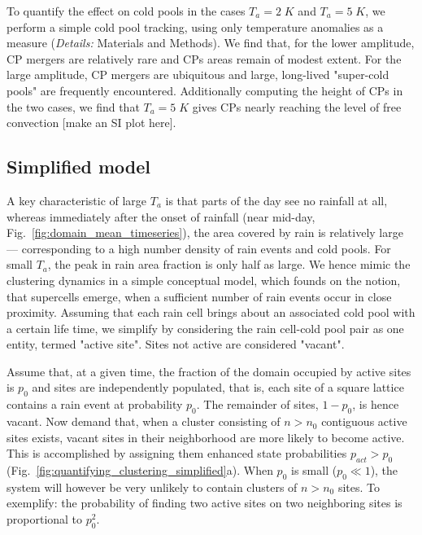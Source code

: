 \documentclass[draft,linenumbers]{agujournal2019}
\begin{document}
To quantify the effect on cold pools in the cases $T_a=2\;K$ and $T_a=5\;K$, we perform a simple cold pool tracking, using only temperature anomalies as a measure ({\it Details:} Materials and Methods).
We find that, for the lower amplitude, CP mergers are relatively rare and CPs areas remain of modest extent. 
For the large amplitude, CP mergers are ubiquitous and large, long-lived "super-cold pools" are frequently encountered. 
Additionally computing the height of CPs in the two cases, we find that $T_a=5\;K$ gives CPs nearly reaching the level of free convection [make an SI plot here]. 


\subsection{Simplified model}
A key characteristic of large $T_a$ is that parts of the day see no rainfall at all, whereas immediately after the onset of rainfall (near mid-day, Fig.~\ref{fig:domain_mean_timeseries}), the area covered by rain is relatively large --- corresponding to a high number density of rain events and cold pools.
For small $T_a$, the peak in rain area fraction is only half as large.  
We hence mimic the clustering dynamics in a simple conceptual model, which founds on the notion, that supercells emerge, when a sufficient number of rain events occur in close proximity. 
Assuming that each rain cell brings about an associated cold pool with a certain life time, we simplify by considering the rain cell-cold pool pair as one entity, termed "active site". 
Sites not active are considered "vacant".

Assume that, at a given time, the fraction of the domain occupied by active sites is $p_0$ and sites are independently populated, that is, each site of a square lattice contains a rain event at probability $p_0$.
The remainder of sites, $1-p_0$, is hence vacant.
Now demand that, when a cluster consisting of $n>n_0$ contiguous active sites exists, vacant sites in their neighborhood are more likely to become active. 
This is accomplished by assigning them enhanced state probabilities $p_{act}>p_0$
(Fig.~\ref{fig:quantifying_clustering_simplified}a).
When $p_0$ is small ($p_0\ll 1$), the system will however be very unlikely to contain clusters of $n>n_0$ sites.
To exemplify: the probability of finding two active sites on two neighboring sites is proportional to $p_0^2$.
\end{document}
